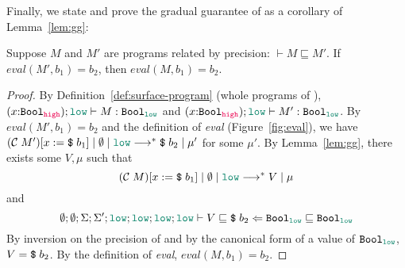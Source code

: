 Finally, we state and prove the gradual guarantee of \Surface as a corollary of Lemma~\ref{lem:gg}:

\begin{theorem}
  \label{thm:gg}
  Suppose $M$ and $M'$ are \Surface programs related by precision: $\vdash M \sqsubseteq M'$.
  If $\mathit{eval}(M', b_1)=b_2$, then $\mathit{eval}(M, b_1)=b_2$.
\end{theorem}
\begin{proof}
  By Definition~\ref{def:surface-program} (whole programs of \Surface),
  $(x{:}\Bool_{\high});\low\vdash M : \Bool_{\low}$ and
  $(x{:}\Bool_{\high});\low\vdash M' : \Bool_{\low}$. By $\mathit{eval}(M',
  b_1)=b_2$ and the definition of \textit{eval}
  (Figure~\ref{fig:eval}), we have
  $\reducemult{(\compile{M'})[x:=\ccconst{b_1}]}{\emptyset}{\low}{\ccconst{b_2}}{\mu'}$
  for some $\mu'$. By Lemma~\ref{lem:gg}, there exists some $V, \mu$ such that
  $$(\compile{M})[x:=\ccconst{b_1}]\mid\emptyset\mid\low \longrightarrow^{*} V\mid\mu$$
  and
  $$\precctx{\emptyset}{\emptyset}{\Sigma}{\Sigma'}{\low}{\low}{\low}{\low}\ccprec{V}{\ccconst{b_2}}{\Bool_{\low}}{\Bool_{\low}}$$
  By inversion on the precision of \CC and by the canonical form of a value of $\Bool_{\low}$, $V = \text{\texttt{{\$}}}\;{b_2}$.
  By the definition of \textit{eval}, $\mathit{eval}(M, b_1)=b_2$.
\end{proof}

